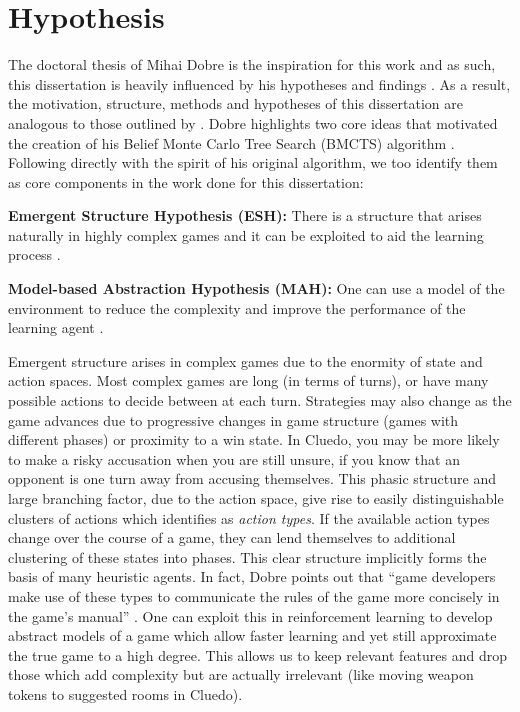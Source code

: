 \documentclass[msc, deptreport, ai, romanprepages]{infthesis}
\begin{document}
\section{Hypothesis}
The doctoral thesis of Mihai Dobre is the inspiration for this work and as such, this dissertation is heavily influenced by his hypotheses and findings \cite{Mihai}. As a result, the motivation, structure, methods and hypotheses of this dissertation are analogous to those outlined by \cite{Mihai}. Dobre highlights two core ideas that motivated the creation of his Belief Monte Carlo Tree Search (BMCTS) algorithm \cite{Mihai}. Following directly with the spirit of his original algorithm, we too identify them as core components in the work done for this dissertation:
\begin{description}
\item \textbf{Emergent Structure Hypothesis (ESH):} There is a structure that arises naturally in highly complex games and it can be exploited to aid the learning process \cite{Mihai}.
\item \textbf{Model-based Abstraction Hypothesis (MAH):} One can use a model of the environment to reduce the complexity and improve the performance of the learning agent \cite{Mihai}.
\end{description}
Emergent structure arises in complex games due to the enormity of state and action spaces. Most complex games are long (in terms of turns), or have many possible actions to decide between at each turn. Strategies may also change as the game advances due to progressive changes in game structure (games with different phases) or proximity to a win state. In Cluedo, you may be more likely to make a risky accusation when you are still unsure, if you know that an opponent is one turn away from accusing themselves. This phasic structure and large branching factor, due to the action space, give rise to easily distinguishable clusters of actions which \cite{Mihai} identifies as \textit{action types}. If the available action types change over the course of a game, they can lend themselves to additional clustering of these states into phases. This clear structure implicitly forms the basis of many heuristic agents. In fact, Dobre points out that ``game developers make use of these types to communicate the rules of the game more concisely in the game’s manual'' \cite{Mihai}. One can exploit this in reinforcement learning to develop abstract models of a game which allow faster learning and yet still approximate the true game to a high degree. This allows us to keep relevant features and drop those which add complexity but are actually irrelevant (like moving weapon tokens to suggested rooms in Cluedo).
\end{document}
